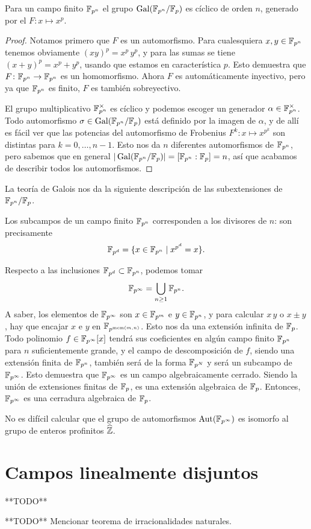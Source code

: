 \begin{teorema}
  Para un campo finito $\mathbb{F}_{p^n}$ el grupo $\operatorname{Gal} (\mathbb{F}_{p^n}/\mathbb{F}_p)$ es cíclico
  de orden $n$, generado por el 
  $F\colon x \mapsto x^p$.

  \begin{proof}
    Notamos primero que $F$ es un automorfismo. Para cualesquiera
    $x,y\in \mathbb{F}_{p^n}$ tenemos obviamente $(xy)^p = x^p\,y^p$, y para las sumas
    se tiene $(x + y)^p = x^p + y^p$, usando que estamos en característica $p$.
    Esto demuestra que $F\colon \mathbb{F}_{p^n} \to \mathbb{F}_{p^n}$ es un homomorfismo.
    Ahora $F$ es automáticamente inyectivo, pero ya que $\mathbb{F}_{p^n}$ es finito,
    $F$ es también sobreyectivo.

    El grupo multiplicativo $\mathbb{F}_{p^n}^\times$ es cíclico y podemos escoger un
    generador $\alpha \in \mathbb{F}_{p^n}^\times$. Todo automorfismo
    $\sigma \in \operatorname{Gal} (\mathbb{F}_{p^n}/\mathbb{F}_p)$ está definido por la imagen de $\alpha$,
    y de allí es fácil ver que las potencias del automorfismo de Frobenius
    $F^k\colon x\mapsto x^{p^k}$ son distintas para $k = 0, \ldots, n-1$.
    Esto nos da $n$ diferentes automorfismos de $\mathbb{F}_{p^n}$, pero sabemos que
    en general $|\operatorname{Gal} (\mathbb{F}_{p^n}/\mathbb{F}_p)| = [\mathbb{F}_{p^n} : \mathbb{F}_p] = n$, así que
    acabamos de describir todos los automorfismos.
  \end{proof}
\end{teorema}

La teoría de Galois nos da la siguiente descripción de las subextensiones
de $\mathbb{F}_{p^n}/\mathbb{F}_p$.

\begin{corolario}
  Los subcampos de un campo finito $\mathbb{F}_{p^n}$ corresponden a los divisores de
  $n$: son precisamente
  $$\mathbb{F}_{p^d} = \{ x\in \mathbb{F}_{p^n} \mid x^{p^d} = x \}.$$
\end{corolario}

\begin{comentario}
  Respecto a las inclusiones $\mathbb{F}_{p^d} \subset \mathbb{F}_{p^n}$, podemos tomar
  $$\mathbb{F}_{p^\infty} = \bigcup_{n\ge 1} \mathbb{F}_{p^n}.$$
  A saber, los elementos de $\mathbb{F}_{p^\infty}$ son $x\in \mathbb{F}_{p^m}$ e
  $y \in \mathbb{F}_{p^n}$, y para calcular $x\,y$ o $x\pm y$, hay que encajar $x$ e $y$
  en $\mathbb{F}_{p^{\operatorname{mcm} (m,n)}}$. Esto nos da una extensión infinita de $\mathbb{F}_p$.
  Todo polinomio $f \in \mathbb{F}_{p^\infty} [x]$ tendrá sus coeficientes en algún campo
  finito $\mathbb{F}_{p^n}$ para $n$ suficientemente grande, y el campo de descomposición
  de $f$, siendo una extensión finita de $\mathbb{F}_{p^n}$, también será de la forma
  $\mathbb{F}_{p^N}$ y será un subcampo de $\mathbb{F}_{p^\infty}$. Esto demuestra que
  $\mathbb{F}_{p^\infty}$ es un campo algebraicamente cerrado. Siendo la unión de
  extensiones finitas de $\mathbb{F}_p$, es una extensión algebraica de
  $\mathbb{F}_p$. Entonces, $\mathbb{F}_{p^\infty}$ es una cerradura algebraica de $\mathbb{F}_p$.

  No es difícil calcular que el grupo de automorfismos $\operatorname{Aut} (\mathbb{F}_{p^\infty})$
  es isomorfo al grupo de enteros profinitos $\widehat{\mathbb{Z}}$.
\end{comentario}


\section{Campos linealmente disjuntos}

**TODO**

**TODO** Mencionar teorema de irracionalidades naturales.
